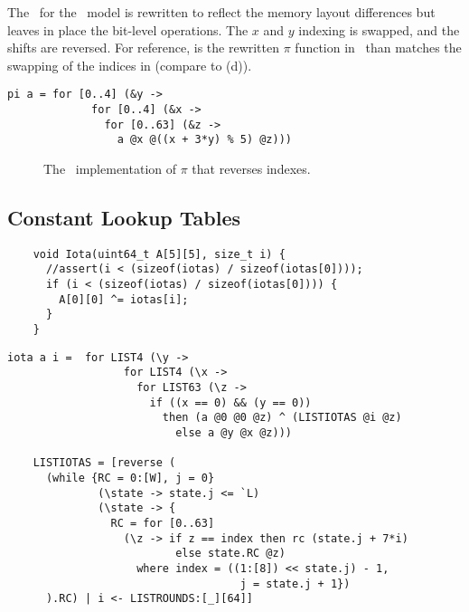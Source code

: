 The \cryptol\ for the \fips\ model is rewritten to reflect the memory layout differences but leaves in place the bit-level operations.
The $x$ and $y$ indexing is swapped, and the shifts are reversed.
For reference,  is the rewritten $\pi$ function in \cryptol\ than matches the swapping of the indices in \openssl (compare to (d)).

\newsavebox{\PiOpenSSL}
\begin{lrbox}{\PiOpenSSL}
  \begin{lstlisting}[language=Cryptol]
    pi a = for [0..4] (&y ->
             for [0..4] (&x -> 
               for [0..63] (&z -> 
                 a @x @((x + 3*y) % 5) @z)))  
  \end{lstlisting}
\end{lrbox}

\begin{figure}[t]
  \begin{center}
    \usebox{\PiOpenSSL}
  \end{center}
  \caption{The \openssl\ implementation of $\pi$ that reverses indexes.}
  \label{fig:piopenssl}
\end{figure}

\subsection{Constant Lookup Tables}

\newsavebox{\ciota}
\begin{lrbox}{\ciota}
  \begin{lstlisting}
    void Iota(uint64_t A[5][5], size_t i) {
      //assert(i < (sizeof(iotas) / sizeof(iotas[0])));
      if (i < (sizeof(iotas) / sizeof(iotas[0]))) {
        A[0][0] ^= iotas[i];
      }
    }
  \end{lstlisting}    
\end{lrbox}


\newsavebox{\cryciota}
\begin{lrbox}{\cryciota}
  \begin{lstlisting}[language=Cryptol]
    iota a i =  for LIST4 (\y ->
                  for LIST4 (\x ->
                    for LIST63 (\z ->
                      if ((x == 0) && (y == 0))
                        then (a @0 @0 @z) ^ (LISTIOTAS @i @z)
	                      else a @y @x @z)))

    LISTIOTAS = [reverse (
      (while {RC = 0:[W], j = 0} 
              (\state -> state.j <= `L) 
              (\state -> { 
                RC = for [0..63] 
                  (\z -> if z == index then rc (state.j + 7*i)
                          else state.RC @z)
                    where index = ((1:[8]) << state.j) - 1,
                                    j = state.j + 1})
      ).RC) | i <- LISTROUNDS:[_][64]]
  \end{lstlisting}    
\end{lrbox}

